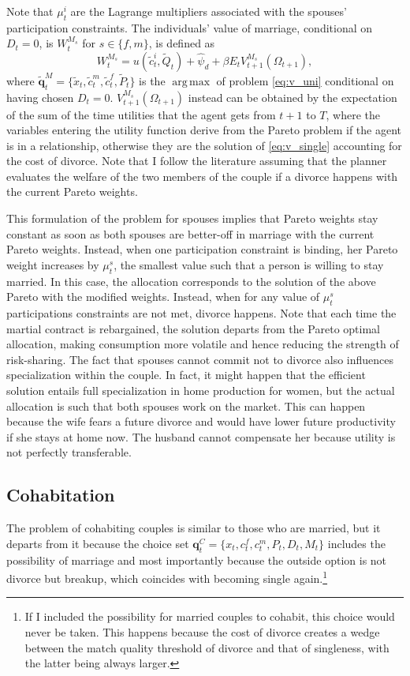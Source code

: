 \documentclass[12pt]{article}
\DeclareMathOperator*{\argmax}{arg\,max}
\begin{document}
Note that $\mu^i_t$ are the Lagrange multipliers associated with the spouses' participation constraints. The individuals' value of marriage, conditional on $D_t=0$, is  $W_{t}^{M_s}$ for $s\in\{f,m\}$, is defined as 
\begin{equation}
W_{t}^{M_s}=u(\tilde{c}_t^{i},\tilde{Q}_t)+\hat{\psi}_d+\beta E_t V_{t+1}^{M_s}(\Omega_{t+1}),
\end{equation}
where
$\mathbf{\tilde{q}}^{M}_t=\{\tilde{x}_{t},\tilde{c}^{m}_{t},\tilde{c}^{f}_{t},\tilde{P}_t\}$ is the $\argmax$ of problem \eqref{eq:v_uni} conditional on having chosen $D_t=0$. $V_{t+1}^{M_s}(\Omega_{t+1})$ instead can be obtained by the expectation of the sum of the time utilities that the agent gets from $t+1$ to $T$, where the variables entering the utility function derive from the Pareto problem if the agent is in a relationship, otherwise they are the solution of \eqref{eq:v_single} accounting for the cost of divorce. Note that I follow the literature assuming that the planner evaluates the welfare of the two members of the couple if a divorce happens with the current Pareto weights.

This formulation of the problem for spouses implies that Pareto weights stay constant as soon as both spouses are better-off in marriage with the current Pareto weights. Instead, when one participation constraint is binding, her Pareto weight increases by $\mu_t^s$, the smallest value such that a person is willing to stay married. In this case, the allocation corresponds to the solution of the above Pareto with the modified weights. Instead, when for any value of $\mu_t^s$ participations constraints are not met, divorce happens. Note that each time the martial contract is rebargained, the solution departs from the Pareto optimal allocation, making consumption more volatile and hence reducing the strength of risk-sharing. The fact that spouses cannot commit not to divorce also influences specialization within the couple. In fact, it might happen that the efficient solution entails full specialization in home production for women, but the actual allocation is such that both spouses work on the market. This can happen because the wife fears a future divorce and would have lower future productivity if she stays at home now. The husband cannot compensate her because utility is not perfectly transferable.  
\subsection{Cohabitation}
The problem of cohabiting couples is similar to those who are married, but it departs from it because the choice set $\mathbf{q}^C_t=\{x_t,c^f_t,c^m_t,P_t,D_t,M_t\}$ includes the possibility of marriage and most importantly because the outside option is not divorce but breakup, which coincides with becoming single again.\footnote{If I included the possibility for married couples to cohabit, this choice would never be taken. This happens because the cost of divorce creates a wedge between the match quality threshold of divorce and that of singleness, with the latter being always larger.}
\end{document}
